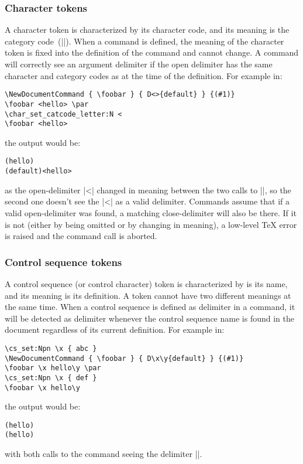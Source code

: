 \documentclass{ltxguide}
\begin{document}
\subsubsection{Character tokens}

A character token is characterized by its character code, and its meaning
is the category code~(|\catcode|).  When a command is defined, the meaning
of the character token is fixed into the definition of the command and
cannot change.  A command will correctly see an argument delimiter if
the open delimiter has the same character and category codes as at the
time of the definition.  For example in:
\begin{verbatim}
\NewDocumentCommand { \foobar } { D<>{default} } {(#1)}
\foobar <hello> \par
\char_set_catcode_letter:N <
\foobar <hello>
\end{verbatim}
the output would be:
\begin{verbatim}
(hello)
(default)<hello>
\end{verbatim}
as the open-delimiter |<| changed in meaning between the two calls to
|\foobar|, so the second one doesn't see the |<| as a valid delimiter.
Commands assume that if a valid open-delimiter was found, a matching
close-delimiter will also be there.  If it is not (either by being
omitted or by changing in meaning), a low-level \TeX{} error is raised
and the command call is aborted.

\subsubsection{Control sequence tokens}

A control sequence (or control character) token is characterized by is
its name, and its meaning is its definition.
A token cannot have two different meanings at the same time.
When a control sequence is defined as delimiter in a command,
it will be detected as delimiter whenever the control sequence name
is found in the document regardless of its current definition.
For example in:
\begin{verbatim}
\cs_set:Npn \x { abc }
\NewDocumentCommand { \foobar } { D\x\y{default} } {(#1)}
\foobar \x hello\y \par
\cs_set:Npn \x { def }
\foobar \x hello\y
\end{verbatim}
the output would be:
\begin{verbatim}
(hello)
(hello)
\end{verbatim}
with both calls to the command seeing the delimiter |\x|.
\end{document}
